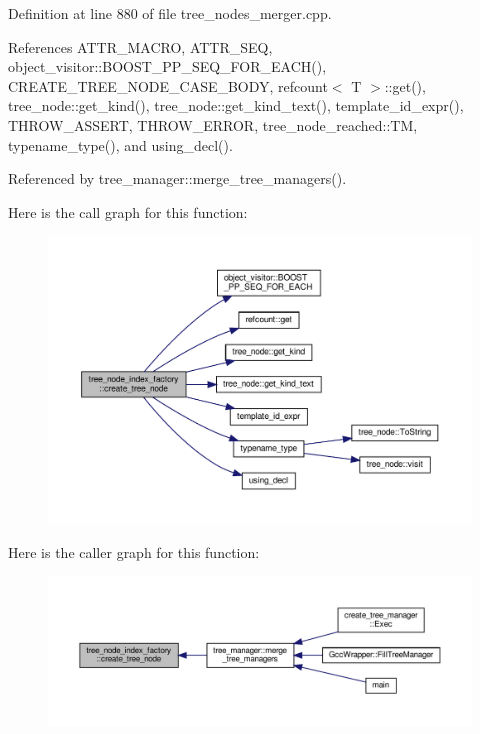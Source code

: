 Definition at line 880 of file tree\+\_\+nodes\+\_\+merger.\+cpp.



References A\+T\+T\+R\+\_\+\+M\+A\+C\+RO, A\+T\+T\+R\+\_\+\+S\+EQ, object\+\_\+visitor\+::\+B\+O\+O\+S\+T\+\_\+\+P\+P\+\_\+\+S\+E\+Q\+\_\+\+F\+O\+R\+\_\+\+E\+A\+C\+H(), C\+R\+E\+A\+T\+E\+\_\+\+T\+R\+E\+E\+\_\+\+N\+O\+D\+E\+\_\+\+C\+A\+S\+E\+\_\+\+B\+O\+DY, refcount$<$ T $>$\+::get(), tree\+\_\+node\+::get\+\_\+kind(), tree\+\_\+node\+::get\+\_\+kind\+\_\+text(), template\+\_\+id\+\_\+expr(), T\+H\+R\+O\+W\+\_\+\+A\+S\+S\+E\+RT, T\+H\+R\+O\+W\+\_\+\+E\+R\+R\+OR, tree\+\_\+node\+\_\+reached\+::\+TM, typename\+\_\+type(), and using\+\_\+decl().



Referenced by tree\+\_\+manager\+::merge\+\_\+tree\+\_\+managers().

Here is the call graph for this function\+:
\nopagebreak
\begin{figure}[H]
\begin{center}
\leavevmode
\includegraphics[width=350pt]{d5/d72/structtree__node__index__factory_a786ee30f904dd9e3fc7428195b6bec81_cgraph}
\end{center}
\end{figure}
Here is the caller graph for this function\+:
\nopagebreak
\begin{figure}[H]
\begin{center}
\leavevmode
\includegraphics[width=350pt]{d5/d72/structtree__node__index__factory_a786ee30f904dd9e3fc7428195b6bec81_icgraph}
\end{center}
\end{figure}


